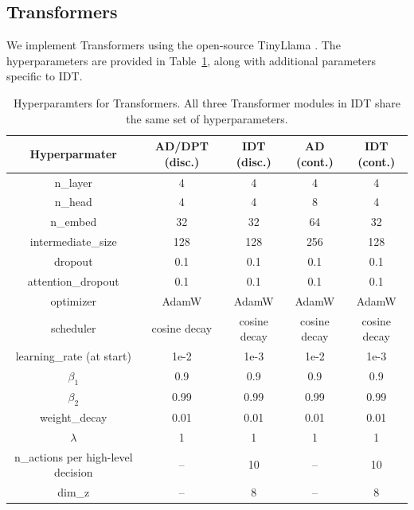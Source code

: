 \documentclass{article}
\begin{document}
\subsection{Transformers}
We implement Transformers using the open-source TinyLlama \citep{TinyLlama}.
The hyperparameters are provided in Table~\ref{tab:hyp-tf}, along with additional parameters specific to IDT.

\begin{table}[h]
    \caption{Hyperparamters for Transformers.
    All three Transformer modules in IDT share the same set of hyperparameters.
    }
    \label{tab:hyp-tf}
    \small \centering
    \begin{tabular}{ccccc}
    \toprule
    Hyperparmater & AD/DPT (disc.) & IDT (disc.) & AD (cont.) & IDT (cont.)\\
    \midrule
    n\_layer & 4 & 4 & 4 & 4\\
    n\_head & 4 & 4 & 8 & 4\\
    n\_embed & 32 & 32 & 64 & 32\\
    intermediate\_size & 128 & 128 & 256 & 128\\
    dropout & 0.1 & 0.1 & 0.1 & 0.1\\
    attention\_dropout & 0.1 & 0.1 & 0.1 & 0.1\\
    optimizer & AdamW & AdamW & AdamW & AdamW\\
    scheduler & cosine decay & cosine decay & cosine decay & cosine decay\\
    learning\_rate (at start) & 1e-2 & 1e-3 & 1e-2 & 1e-3\\
    $\beta_1$ & 0.9 & 0.9 & 0.9 & 0.9\\
    $\beta_2$ & 0.99 & 0.99 & 0.99 & 0.99\\
    weight\_decay & 0.01 & 0.01 & 0.01 & 0.01\\
    $\lambda$ & 1 & 1 & 1 & 1\\
    \midrule
    n\_actions per high-level decision & -- & 10 & -- & 10 \\
    dim\_z & -- & 8 & -- &8\\
    \bottomrule
    \end{tabular}
\end{table}
\end{document}

